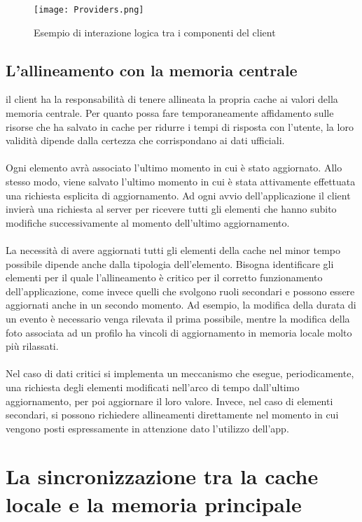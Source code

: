 \begin{figure}[h!]
    \centering
    \texttt{[image: Providers.png]}
    \caption{Esempio di interazione logica tra i componenti del client}
\end{figure}	
\clearpage

\subsection{L'allineamento con la memoria centrale}

il client ha la responsabilità di tenere allineata la propria cache ai valori della memoria centrale. 
Per quanto possa fare temporaneamente affidamento sulle risorse che ha salvato in cache per ridurre i tempi di risposta con l’utente, 
la loro validità dipende dalla certezza che corrispondano ai dati ufficiali. \\
\\

Ogni elemento avrà associato l’ultimo momento in cui è stato aggiornato. 
Allo stesso modo, viene salvato l’ultimo momento in cui è stata attivamente effettuata una richiesta esplicita di aggiornamento.  
Ad ogni avvio dell’applicazione il client invierà una richiesta al server per ricevere tutti gli elementi che hanno subito modifiche successivamente al momento dell’ultimo aggiornamento.\\
\\
La necessità di avere aggiornati tutti gli elementi della cache nel minor tempo possibile dipende anche dalla tipologia dell’elemento. 
Bisogna identificare gli elementi per il quale l’allineamento è critico per il corretto funzionamento dell’applicazione, 
come invece quelli che svolgono ruoli secondari e possono essere aggiornati anche in un secondo momento. 
Ad esempio, la modifica della durata di un evento è necessario venga rilevata il prima possibile, 
mentre la modifica della foto associata ad un profilo ha vincoli di aggiornamento in memoria locale molto più rilassati.\\
\\
Nel caso di dati critici si implementa un meccanismo che esegue, periodicamente, una richiesta degli elementi modificati nell’arco di tempo dall’ultimo aggiornamento, 
per poi aggiornare il loro valore. Invece, nel caso di elementi secondari, 
si possono richiedere allineamenti direttamente nel momento in cui vengono posti espressamente in attenzione dato l’utilizzo dell’app.

\clearpage
\section{La sincronizzazione tra la cache locale e la memoria principale}

